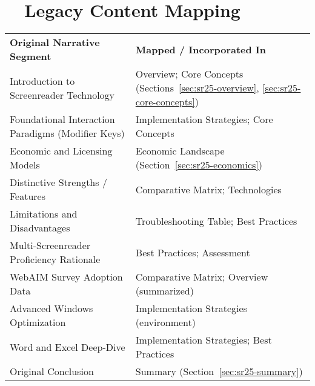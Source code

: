 \section{~~Legacy Content Mapping}
\label{sec:sr25-legacy-mapping}
\begin{tabular}{p{} p{}}
	\textbf{Original Narrative Segment}                & \textbf{Mapped / Incorporated In}                                                        \\
	Introduction to Screenreader Technology            & Overview; Core Concepts (Sections~\ref{sec:sr25-overview}, \ref{sec:sr25-core-concepts}) \\
	Foundational Interaction Paradigms (Modifier Keys) & Implementation Strategies; Core Concepts                                                 \\
	Economic and Licensing Models                      & Economic Landscape (Section~\ref{sec:sr25-economics})                                    \\
	Distinctive Strengths / Features                   & Comparative Matrix; Technologies                                                         \\
	Limitations and Disadvantages                      & Troubleshooting Table; Best Practices                                                    \\
	Multi-Screenreader Proficiency Rationale           & Best Practices; Assessment                                                               \\
	WebAIM Survey Adoption Data                        & Comparative Matrix; Overview (summarized)                                                \\
	Advanced Windows Optimization                      & Implementation Strategies (environment)                                                  \\
	Word and Excel Deep-Dive                           & Implementation Strategies; Best Practices                                                \\
	Original Conclusion                                & Summary (Section~\ref{sec:sr25-summary})                                                 \\
\end{tabular}

